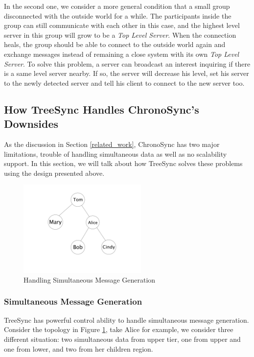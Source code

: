 \documentclass[conference]{IEEEtran}
\begin{document}
In the second one,
we consider a more general condition that a small group disconnected
with the outside world for a while.
The participants inside the group can still communicate with each other in this case,
and the highest level server in this group will grow to be a \emph{Top Level Server}.
When the connection heals,
the group should be able to connect to the outside world again and
exchange messages instead of remaining a close system with its own \emph{Top Level Server}.
To solve this problem, a server can broadcast an interest inquiring if there is a same level server nearby.
If so, the server will decrease his level,
set his server to the newly detected server and tell his client to connect to the new server too.

\subsection{How TreeSync Handles ChronoSync's Downsides}

As the discussion in Section \ref{related_work},
ChronoSync has two major limitations, trouble of handling simultaneous data as well as no scalability support.
In this section, we will talk about how TreeSync solves these problems using the design presented above.

\begin{figure}[!t]
\centering
\includegraphics[width=2.5in]{../png/merit.png}
\caption{Handling Simultaneous Message Generation}
\label{merit}
\end{figure}

\subsubsection{Simultaneous Message Generation}
TreeSync has powerful control ability to handle simultaneous message generation.
Consider the topology in Figure \ref{merit},
take Alice for example, we consider three different situation:
two simultaneous data from upper tier, one from upper and one from lower,
and two from her children region.
\end{document}
